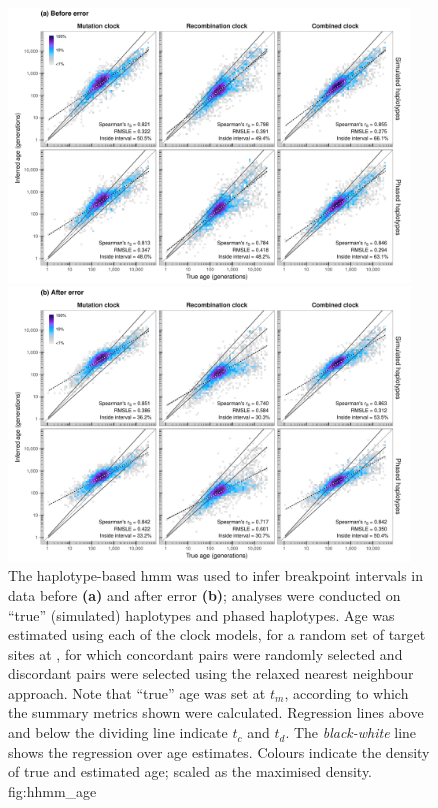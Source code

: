 

\begin{figure}[p]
\centering
\vspace*{-5pt}
\includegraphics[width=0.95\textwidth]{./img/ch5/hhmm_age_A}
\includegraphics[width=0.95\textwidth]{./img/ch5/hhmm_age_B}
{The haplotype-based \gls{hmm} was used to infer breakpoint intervals in data before \textbf{(a)} and after error \textbf{(b)}; analyses were conducted on ``true'' (simulated) haplotypes and phased haplotypes.
Age was estimated using each of the  clock models, for a random set of  target sites at , for which  concordant pairs were randomly selected and  discordant pairs were selected using the relaxed nearest neighbour approach.
Note that ``true'' age was set at $t_m$, according to which the summary metrics shown were calculated.
Regression lines above and below the dividing line indicate $t_c$ and $t_d$.
The \emph{black-white} line shows the regression over age estimates.
Colours indicate the density of true and estimated age; scaled as the maximised density.}
{fig:hhmm_age}
\end{figure}
